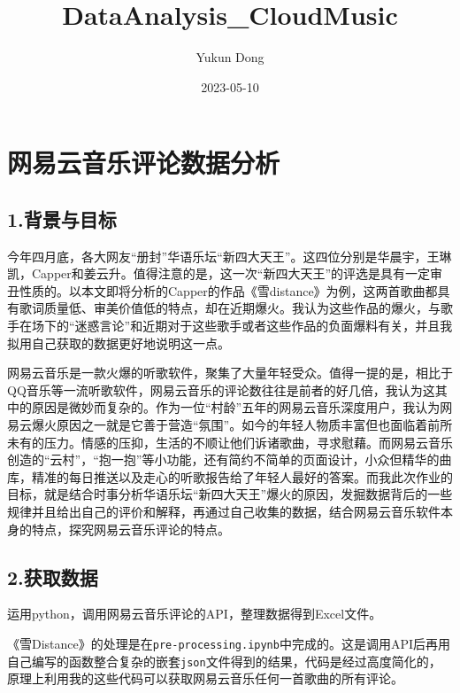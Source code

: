 \documentclass[
]{article}
\title{DataAnalysis\_CloudMusic}
\author{Yukun Dong}
\date{2023-05-10}
\begin{document}
\maketitle

{
\setcounter{tocdepth}{4}
\tableofcontents
}
\hypertarget{ux7f51ux6613ux4e91ux97f3ux4e50ux8bc4ux8bbaux6570ux636eux5206ux6790}{%
\section{网易云音乐评论数据分析}\label{ux7f51ux6613ux4e91ux97f3ux4e50ux8bc4ux8bbaux6570ux636eux5206ux6790}}

\hypertarget{ux80ccux666fux4e0eux76eeux6807}{%
\subsection{1.背景与目标}\label{ux80ccux666fux4e0eux76eeux6807}}

今年四月底，各大网友``册封''华语乐坛``新四大天王''。这四位分别是华晨宇，王琳凯，Capper和姜云升。值得注意的是，这一次``新四大天王''的评选是具有一定审丑性质的。以本文即将分析的Capper的作品《雪distance》为例，这两首歌曲都具有歌词质量低、审美价值低的特点，却在近期爆火。我认为这些作品的爆火，与歌手在场下的``迷惑言论''和近期对于这些歌手或者这些作品的负面爆料有关，并且我拟用自己获取的数据更好地说明这一点。

网易云音乐是一款火爆的听歌软件，聚集了大量年轻受众。值得一提的是，相比于QQ音乐等一流听歌软件，网易云音乐的评论数往往是前者的好几倍，我认为这其中的原因是微妙而复杂的。作为一位``村龄''五年的网易云音乐深度用户，我认为网易云爆火原因之一就是它善于营造``氛围''。如今的年轻人物质丰富但也面临着前所未有的压力。情感的压抑，生活的不顺让他们诉诸歌曲，寻求慰藉。而网易云音乐创造的``云村''，``抱一抱''等小功能，还有简约不简单的页面设计，小众但精华的曲库，精准的每日推送以及走心的听歌报告给了年轻人最好的答案。而我此次作业的目标，就是结合时事分析华语乐坛``新四大天王''爆火的原因，发掘数据背后的一些规律并且给出自己的评价和解释，再通过自己收集的数据，结合网易云音乐软件本身的特点，探究网易云音乐评论的特点。

\hypertarget{ux83b7ux53d6ux6570ux636e}{%
\subsection{2.获取数据}\label{ux83b7ux53d6ux6570ux636e}}

运用python，调用网易云音乐评论的API，整理数据得到Excel文件。

《雪Distance》的处理是在\texttt{pre-processing.ipynb}中完成的。这是调用API后再用自己编写的函数整合复杂的嵌套\texttt{json}文件得到的结果，代码是经过高度简化的，原理上利用我的这些代码可以获取网易云音乐任何一首歌曲的所有评论。
\end{document}
